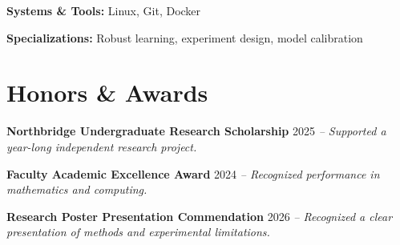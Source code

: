 \documentclass[11pt,a4paper]{article}
\begin{document}
\textbf{Systems \& Tools:} Linux, Git, Docker

\textbf{Specializations:} Robust learning, experiment design, model calibration

\section{Honors \& Awards}
\textbf{Northbridge Undergraduate Research Scholarship} \hfill 2025 \textit{-- Supported a year-long independent research project.}

\textbf{Faculty Academic Excellence Award} \hfill 2024 \textit{-- Recognized performance in mathematics and computing.}

\textbf{Research Poster Presentation Commendation} \hfill 2026 \textit{-- Recognized a clear presentation of methods and experimental limitations.}
\end{document}
